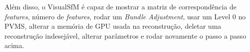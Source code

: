 
Além disso, o VisualSfM é capaz de mostrar a matriz de correspondência de {\it features}, número de {\it features}, rodar um {\it Bundle Adjustment}, usar um Level 0 no PVMS, alterar a memória de GPU usada na reconstrução, deletar uma reconstrução indesejável, alterar parâmetros e rodar novamente o passo a passo acima.